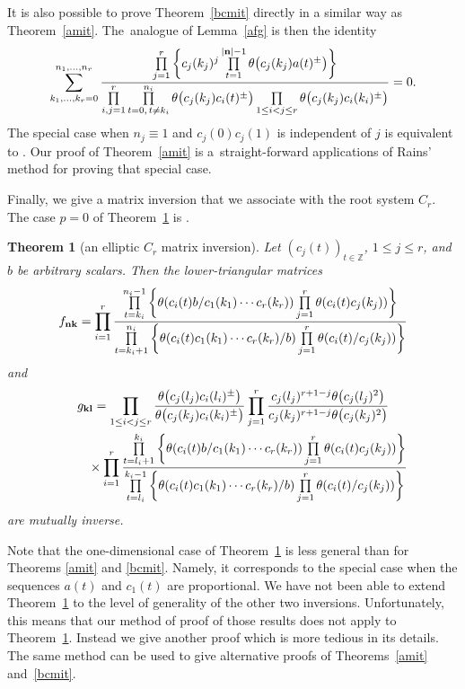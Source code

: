 \documentclass[pdftex]{sigma}%
\numberwithin{equation}{section}
\newtheorem{Theorem}{Theorem}[section]
\begin{document}
It is also possible to prove Theorem~\ref{bcmit} directly in a similar way as
 Theorem~\ref{amit}. The~ana\-logue of Lemma~\ref{afg}
is then the identity
\begin{gather*}
\sum_{k_1,\dots,k_r=0}^{n_1,\dots,n_r}\frac{\prod\limits_{j=1}^r
\bigg\{c_j(k_j)^j\prod\limits_{t=1}^{|{\bf n}|-1}\theta\big(c_j(k_j)a(t)^\pm\big)\bigg\}}
{\prod\limits_{i,j=1}^r\prod\limits_{t=0,\,t\neq
k_i}^{n_i}\theta\big(c_j(k_j)c_i(t)^\pm\big)
\prod\limits_{1\leq i<j\leq r}\theta\big(c_j(k_j)c_i(k_i)^\pm\big)}=0.
\end{gather*}
The special case when $n_j\equiv 1$ and $c_j(0)c_j(1)$ is independent of $j$ is equivalent to \cite[Lemma~7.8]{ra}.
Our proof of Theorem~\ref{amit} is a~straight-forward applications of Rains' method for proving that special case.

Finally, we give a matrix inversion that we associate with the
root system $C_r$. The case $p=0$ of Theorem~\ref{cmit} is \cite[Theorem~4.1]{s}.

\begin{Theorem}[an elliptic $C_r$ matrix inversion]\label{cmit}
Let $(c_j(t))_{t\in\mathbb Z}$, $1 \leq j \leq r$, and $b$ be arbitrary scalars. Then the lower-triangular matrices
\begin{gather*}f_{\bf nk}=\prod\limits_{i=1}^r\frac{\prod\limits_{t=k_i}^{n_i-1}
\bigg\{\theta(c_i(t)b/c_1(k_1)\dotsm c_r(k_r))\prod\limits_{j=1}^r\theta(c_i(t)c_j(k_j))\bigg\}}
{\prod\limits_{t=k_i+1}^{n_i} \bigg\{\theta(c_i(t)c_1(k_1)\dotsm c_r(k_r)/b)
\prod\limits_{j=1}^r\theta(c_i(t)/c_j(k_j))\bigg\}}
\end{gather*}
and
\begin{gather*}
g_{\bf kl}=
\prod\limits_{1\leq i<j\leq r}\frac{\theta\big(c_j(l_j)c_i(l_i)^\pm\big)}
{\theta\big(c_j(k_j)c_i(k_i)^\pm\big)}
\prod\limits_{j=1}^r\frac{c_j(l_j)^{r+1-j}\theta\big(c_j(l_j)^2\big)}
{c_j(k_j)^{r+1-j}\theta\big(c_j(k_j)^2\big)}
\\ \phantom{g_{\bf kl}=}{}
\times\prod\limits_{i=1}^r\frac{\prod\limits_{t=l_i+1}^{k_i}
\bigg\{\theta(c_i(t)b/c_1(k_1)\dotsm
 c_r(k_r))\prod\limits_{j=1}^r\theta(c_i(t)c_j(k_j))\bigg\}}
{\prod\limits_{t=l_i}^{k_i-1}
\bigg\{\theta(c_i(t)c_1(k_1)\dotsm c_r(k_r)/b)
\prod\limits_{j=1}^r\theta(c_i(t)/c_j(k_j))\bigg\}}
\end{gather*}
are mutually inverse.
\end{Theorem}



Note that the one-dimensional case of Theorem~\ref{cmit} is less
general than for Theorems \ref{amit} and \ref{bcmit}. Namely, it
corresponds to the special case when the sequences $a(t)$ and $c_1(t)$
are proportional. We have not been able to extend
Theorem~\ref{cmit} to the level of generality of the
other two inversions. Unfortunately, this means that our method of
proof of those results does not apply to Theorem~\ref{cmit}.
Instead we give another proof which
is more tedious in its details. The same method can be used to
give alternative proofs of
 Theorems~\ref{amit} and~\ref{bcmit}.
\end{document}
